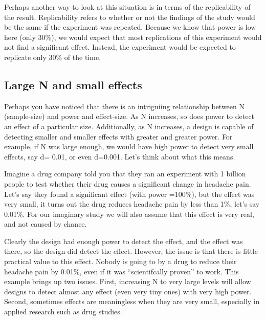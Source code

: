 \documentclass[
  letterpaper,
  DIV=11,
  numbers=noendperiod]{scrreprt}
\begin{document}
Perhaps another way to look at this situation is in terms of the
replicability of the result. Replicability refers to whether or not the
findings of the study would be the same if the experiment was repeated.
Because we know that power is low here (only 30\%), we would expect that
most replications of this experiment would not find a significant
effect. Instead, the experiment would be expected to replicate only 30\%
of the time.

\subsection{Large N and small
effects}\label{large-n-and-small-effects-1}

Perhaps you have noticed that there is an intriguiing relationship
between N (sample-size) and power and effect-size. As N increases, so
does power to detect an effect of a particular size. Additionally, as N
increases, a design is capable of detecting smaller and smaller effects
with greater and greater power. For example, if N was large enough, we
would have high power to detect very small effects, say d= 0.01, or even
d=0.001. Let's think about what this means.

Imagine a drug company told you that they ran an experiment with 1
billion people to test whether their drug causes a significant change in
headache pain. Let's say they found a significant effect (with power
=100\%), but the effect was very small, it turns out the drug reduces
headache pain by less than 1\%, let's say 0.01\%. For our imaginary
study we will also assume that this effect is very real, and not caused
by chance.

Clearly the design had enough power to detect the effect, and the effect
was there, so the design did detect the effect. However, the issue is
that there is little practical value to this effect. Nobody is going to
by a drug to reduce their headache pain by 0.01\%, even if it was
``scientifcally proven'' to work. This example brings up two issues.
First, increasing N to very large levels will allow designs to detect
almost any effect (even very tiny ones) with very high power. Second,
sometimes effects are meaningless when they are very small, especially
in applied research such as drug studies.
\end{document}
